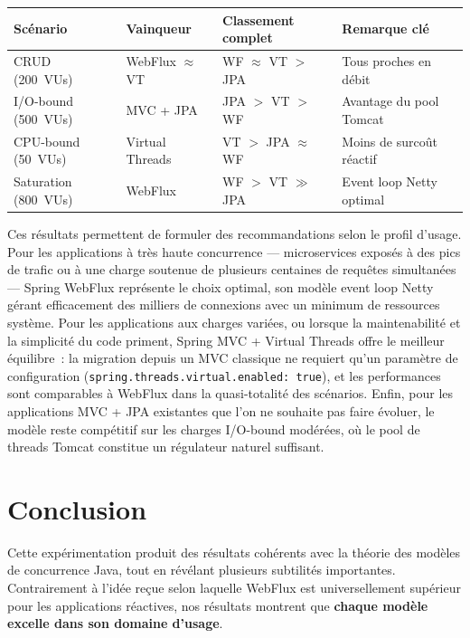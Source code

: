 \begin{center}
\begin{tabular}{|l|l|l|L{4.5cm}|}
\hline
\textbf{Scénario} & \textbf{Vainqueur} & \textbf{Classement complet} & \textbf{Remarque clé} \\
\hline
CRUD (200~VUs)       & WebFlux $\approx$ VT     & WF $\approx$ VT $>$ JPA & Tous proches en débit \\
I/O-bound (500~VUs)  & MVC + JPA                & JPA $>$ VT $>$ WF        & Avantage du pool Tomcat \\
CPU-bound (50~VUs)   & Virtual Threads          & VT $>$ JPA $\approx$ WF  & Moins de surcoût réactif \\
Saturation (800~VUs) & WebFlux                  & WF $>$ VT $\gg$ JPA      & Event loop Netty optimal \\
\hline
\end{tabular}
\end{center}

Ces résultats permettent de formuler des recommandations selon le profil d'usage. Pour les
applications à très haute concurrence — microservices exposés à des pics de trafic ou à une charge
soutenue de plusieurs centaines de requêtes simultanées — Spring WebFlux représente le choix
optimal, son modèle event loop Netty gérant efficacement des milliers de connexions avec un minimum
de ressources système. Pour les applications aux charges variées, ou lorsque la maintenabilité et
la simplicité du code priment, Spring MVC + Virtual Threads offre le meilleur équilibre~: la
migration depuis un MVC classique ne requiert qu'un paramètre de configuration
(\texttt{spring.threads.virtual.enabled: true}), et les performances sont comparables à WebFlux
dans la quasi-totalité des scénarios. Enfin, pour les applications MVC + JPA existantes que l'on
ne souhaite pas faire évoluer, le modèle reste compétitif sur les charges I/O-bound modérées, où
le pool de threads Tomcat constitue un régulateur naturel suffisant.

\section{Conclusion}

Cette expérimentation produit des résultats cohérents avec la théorie des modèles de concurrence
Java, tout en révélant plusieurs subtilités importantes. Contrairement à l'idée reçue selon
laquelle WebFlux est universellement supérieur pour les applications réactives, nos résultats
montrent que \textbf{chaque modèle excelle dans son domaine d'usage}.

